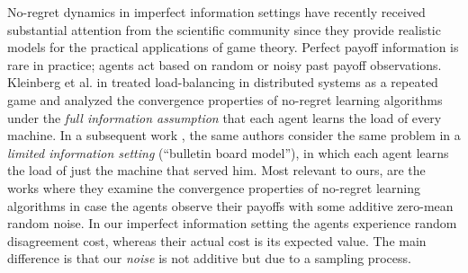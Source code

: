 No-regret dynamics in imperfect information settings have recently received
substantial attention from the scientific community since they provide
realistic models for the practical applications of game theory.  Perfect payoff
information is rare in practice; agents act based on random or noisy past
payoff observations.  Kleinberg et al. in \cite{KPT09} treated load-balancing
in distributed systems as a repeated game and analyzed the convergence
properties of no-regret learning algorithms under the \emph{full information
  assumption} that each agent learns the load of every machine.  In a
subsequent work \cite{KPT11}, the same authors consider the same problem in a
\emph{limited information setting} (\enquote{bulletin board model}), in which
each agent learns the load of just the machine that served him. Most relevant
to ours, are the works \cite{HCM17,MS17,BM17,CHM17} where they examine the
convergence properties of no-regret learning algorithms in case the agents
observe their payoffs with some additive zero-mean random noise. In our
imperfect information setting the agents experience random disagreement cost,
whereas their actual cost is its expected value. The main difference is that
our \emph{noise} is not additive but due to a sampling process.
